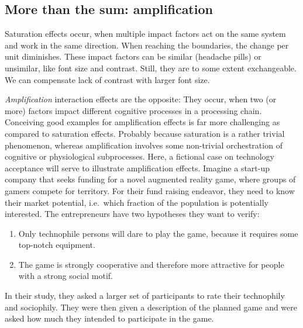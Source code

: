 \documentclass[]{svmono}
\begin{document}
\subsection{More than the sum:
amplification}\label{more-than-the-sum-amplification}

Saturation effects occur, when multiple impact factors act on the same
system and work in the same direction. When reaching the boundaries, the
change per unit diminishes. These impact factors can be similar
(headache pills) or unsimilar, like font size and contrast. Still, they
are to some extent exchangeable. We can compensate lack of contrast with
larger font size.

\emph{Amplification} interaction effects are the opposite: They occur,
when two (or more) factors impact different cognitive processes in a
processing chain. Conceiving good examples for amplification effects is
far more challenging as compared to saturation effects. Probably because
saturation is a rather trivial phenomenon, whereas amplification
involves some non-trivial orchestration of cognitive or physiological
subprocesses. Here, a fictional case on technology acceptance will serve
to illustrate amplification effects. Imagine a start-up company that
seeks funding for a novel augmented reality game, where groups of gamers
compete for territory. For their fund raising endeavor, they need to
know their market potential, i.e.~which fraction of the population is
potentially interested. The entrepreneurs have two hypotheses they want
to verify:

\begin{enumerate}
\def\labelenumi{\arabic{enumi}.}
\item
  Only technophile persons will dare to play the game, because it
  requires some top-notch equipment.
\item
  The game is strongly cooperative and therefore more attractive for
  people with a strong social motif.
\end{enumerate}

In their study, they asked a larger set of participants to rate their
technophily and sociophily. They were then given a description of the
planned game and were asked how much they intended to participate in the
game.
\end{document}
